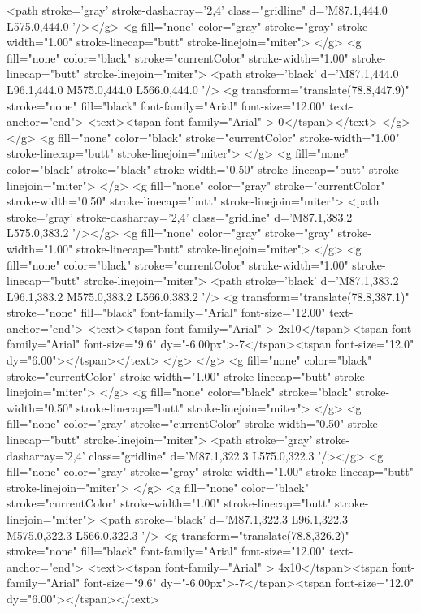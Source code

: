 	<path stroke='gray' stroke-dasharray='2,4' class="gridline"  d='M87.1,444.0 L575.0,444.0  '/></g>
<g fill="none" color="gray" stroke="gray" stroke-width="1.00" stroke-linecap="butt" stroke-linejoin="miter">
</g>
<g fill="none" color="black" stroke="currentColor" stroke-width="1.00" stroke-linecap="butt" stroke-linejoin="miter">
	<path stroke='black'  d='M87.1,444.0 L96.1,444.0 M575.0,444.0 L566.0,444.0  '/>	<g transform="translate(78.8,447.9)" stroke="none" fill="black" font-family="Arial" font-size="12.00"  text-anchor="end">
		<text><tspan font-family="Arial" > 0</tspan></text>
	</g>
</g>
<g fill="none" color="black" stroke="currentColor" stroke-width="1.00" stroke-linecap="butt" stroke-linejoin="miter">
</g>
<g fill="none" color="black" stroke="black" stroke-width="0.50" stroke-linecap="butt" stroke-linejoin="miter">
</g>
<g fill="none" color="gray" stroke="currentColor" stroke-width="0.50" stroke-linecap="butt" stroke-linejoin="miter">
	<path stroke='gray' stroke-dasharray='2,4' class="gridline"  d='M87.1,383.2 L575.0,383.2  '/></g>
<g fill="none" color="gray" stroke="gray" stroke-width="1.00" stroke-linecap="butt" stroke-linejoin="miter">
</g>
<g fill="none" color="black" stroke="currentColor" stroke-width="1.00" stroke-linecap="butt" stroke-linejoin="miter">
	<path stroke='black'  d='M87.1,383.2 L96.1,383.2 M575.0,383.2 L566.0,383.2  '/>	<g transform="translate(78.8,387.1)" stroke="none" fill="black" font-family="Arial" font-size="12.00"  text-anchor="end">
		<text><tspan font-family="Arial" > 2x10</tspan><tspan font-family="Arial"  font-size="9.6" dy="-6.00px">-7</tspan><tspan font-size="12.0" dy="6.00"></tspan></text>
	</g>
</g>
<g fill="none" color="black" stroke="currentColor" stroke-width="1.00" stroke-linecap="butt" stroke-linejoin="miter">
</g>
<g fill="none" color="black" stroke="black" stroke-width="0.50" stroke-linecap="butt" stroke-linejoin="miter">
</g>
<g fill="none" color="gray" stroke="currentColor" stroke-width="0.50" stroke-linecap="butt" stroke-linejoin="miter">
	<path stroke='gray' stroke-dasharray='2,4' class="gridline"  d='M87.1,322.3 L575.0,322.3  '/></g>
<g fill="none" color="gray" stroke="gray" stroke-width="1.00" stroke-linecap="butt" stroke-linejoin="miter">
</g>
<g fill="none" color="black" stroke="currentColor" stroke-width="1.00" stroke-linecap="butt" stroke-linejoin="miter">
	<path stroke='black'  d='M87.1,322.3 L96.1,322.3 M575.0,322.3 L566.0,322.3  '/>	<g transform="translate(78.8,326.2)" stroke="none" fill="black" font-family="Arial" font-size="12.00"  text-anchor="end">
		<text><tspan font-family="Arial" > 4x10</tspan><tspan font-family="Arial"  font-size="9.6" dy="-6.00px">-7</tspan><tspan font-size="12.0" dy="6.00"></tspan></text>
